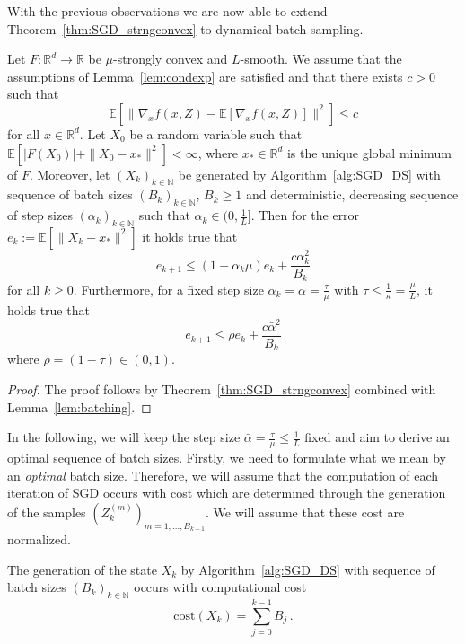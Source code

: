 \documentclass[12pt,openany]{book}
\theoremstyle{definition}
\theoremstyle{definition}
\newcommand{\E}{\mathbb{E}}
\newcommand{\N}{\mathbb{N}}
\newcommand{\R}{\mathbb{R}}
\begin{document}
With the previous observations we are now able to extend Theorem~\ref{thm:SGD_strngconvex} to dynamical batch-sampling. 
\begin{thm}\label{thm:SGD_DS}
Let $F:\R^d\to\R$ be $\mu$-strongly convex and $L$-smooth. We assume that the assumptions of Lemma~\ref{lem:condexp} are satisfied and that there exists $c>0$ such that
\[\E[\|\nabla_x f(x,Z) - \E[\nabla_x f(x,Z)] \|^2] \le c \]
for all $x\in\R^d$. Let $X_0$ be a random variable such that $\E[|F(X_0)| + \|X_0-x_\ast\|^2]<\infty$, where $x_\ast\in\R^d$ is the unique global minimum of $F$. Moreover, let $(X_k)_{k\in\N}$ be generated by Algorithm~\ref{alg:SGD_DS} with sequence of batch sizes $(B_k)_{k\in\N}$, $B_k\ge1$ and deterministic, decreasing sequence of step sizes $(\alpha_k)_{k\in\N}$ such that $\alpha_k\in(0,\frac1L]$. Then for the error $e_k:=\E[\|X_k-x_\ast\|^2]$ it holds true that
\[e_{k+1} \le (1-\alpha_k \mu) e_k + \frac{c\alpha_k^2}{B_k}\]
for all $k\ge0$. Furthermore, for a fixed step size $\alpha_k = \bar\alpha = \frac{\tau}{\mu}$ with $\tau\le \frac{1}{\kappa} = \frac{\mu}{L}$, it holds true that
\begin{equation}\label{eq:SGD_iterativeerror}
e_{k+1} \le \rho e_k + \frac{c\bar{\alpha}^2}{B_k}
\end{equation}
where $\rho = (1-\tau)\in(0,1)$.
\end{thm}
\begin{proof}
The proof follows by Theorem~\ref{thm:SGD_strngconvex} combined with Lemma~\ref{lem:batching}.
\end{proof}

In the following, we will keep the step size $\bar \alpha = \frac{\tau}{\mu}\le \frac1L$ fixed and aim to derive an optimal sequence of batch sizes. Firstly, we need to formulate what we mean by an \textit{optimal} batch size. Therefore, we will assume that the computation of each iteration of SGD occurs with cost which are determined through the generation of the samples $(Z_k^{(m)})_{m=1,\dots,B_{k-1}}$. We will assume that these cost are normalized.
\begin{ass}
The generation of the state $X_k$ by Algorithm~\ref{alg:SGD_DS} with sequence of batch sizes $(B_k)_{k\in\N}$ occurs with computational cost
\[{\mathrm{cost}}(X_k) = \sum_{j=0}^{k-1} B_j\,. \]
\end{ass}
\end{document}
